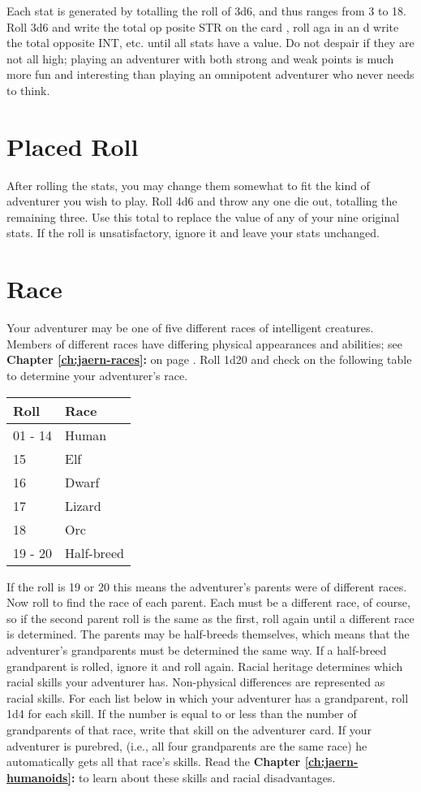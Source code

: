 \begin{multicols}{2}
Each stat is generated by totalling the roll of 3d6, and thus ranges from 3 to 18. Roll 3d6 and write the total op posite STR on the card , roll aga in an d write the total opposite INT, etc. until all stats have a value. Do not despair if they are not all high; playing an adventurer with both strong and weak points is much more fun and interesting than playing an omnipotent adventurer who never needs to think.
\section{Placed Roll}
After rolling the stats, you may change them somewhat to fit the kind of adventurer you wish to play. Roll 4d6 and throw any one die out, totalling the remaining three. Use this total to replace the value of any of your nine original stats. If the roll is unsatisfactory, ignore it and leave your stats unchanged.
\section{Race}
Your adventurer may be one of five different races of intelligent creatures. Members of different races have differing physical appearances and abilities; see \textbf{Chapter \ref{ch:jaern-races}: } on page \textbf{\pageref{jh-races}}. Roll 1d20 and check on the following table to determine your adventurer’s race.
\begin{tcolorbox}[breakable,boxrule=0pt]
\begin{tabular}{l l}
Roll & Race\\
\midrule
01 - 14 & Human\\
15 & Elf\\
16 & Dwarf \\
17 & Lizard\\
18 & Orc\\
19 - 20 & Half-breed\\
\end{tabular}
\end{tcolorbox}
If the roll is 19 or 20 this means the adventurer’s parents were of different races. Now roll to find the race of each parent. Each must be a different race, of course, so if the second parent roll is the same as the first, roll again until a different race is determined. The parents may be half-breeds themselves, which means that the adventurer’s grandparents must be determined the same way. If a half-breed grandparent is rolled, ignore it and roll again. Racial heritage determines which racial skills your adventurer has. Non-physical differences are represented as racial skills. For each list below in which your adventurer has a grandparent, roll 1d4 for each skill. If the number is equal to or less than the number of grandparents of that race, write that skill on the adventurer card. If your adventurer is purebred, (i.e., all four grandparents are the same race) he automatically gets all that race's skills. Read the \textbf{Chapter \ref{ch:jaern-humanoids}: } to learn about these skills and racial disadvantages.


\end{multicols}

